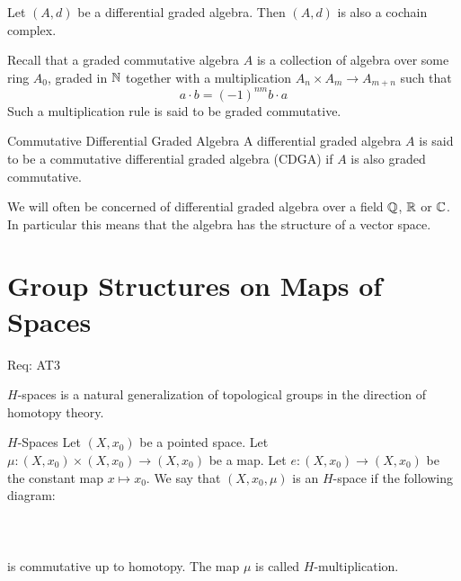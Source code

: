 \documentclass[a4paper]{article}
\begin{document}
\begin{lmm}{}{} Let $(A,d)$ be a differential graded algebra. Then $(A,d)$ is also a cochain complex. 
\end{lmm}

Recall that a graded commutative algebra $A$ is a collection of algebra over some ring $A_0$, graded in $\mathbb{N}$ together with a multiplication $A_n\times A_m\to A_{m+n}$ such that $$a\cdot b=(-1)^{nm}b\cdot a$$ Such a multiplication rule is said to be graded commutative. 

\begin{defn}{Commutative Differential Graded Algebra}{} A differential graded algebra $A$ is said to be a commutative differential graded algebra (CDGA) if $A$ is also graded commutative. 
\end{defn}

We will often be concerned of differential graded algebra over a field $\mathbb{Q}$, $\mathbb{R}$ or $\mathbb{C}$. In particular this means that the algebra has the structure of a vector space. 

\pagebreak
\section{Group Structures on Maps of Spaces}

Req: AT3

$H$-spaces is a natural generalization of topological groups in the direction of homotopy theory. 

\begin{defn}{$H$-Spaces}{} Let $(X,x_0)$ be a pointed space. Let $\mu:(X,x_0)\times(X,x_0)\to(X,x_0)$ be a map. Let $e:(X,x_0)\to(X,x_0)$ be the constant map $x\mapsto x_0$. We say that $(X,x_0,\mu)$ is an $H$-space if the following diagram: \\~\\
\\~\\
is commutative up to homotopy. The map $\mu$ is called $H$-multiplication. 
\end{defn}
\end{document}
